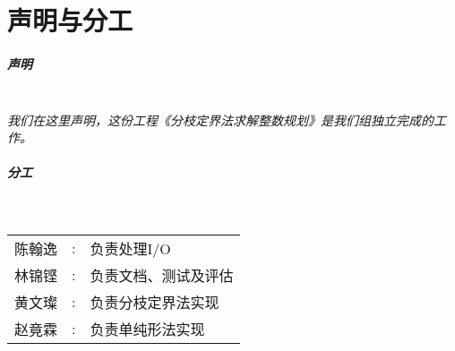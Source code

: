 \chapter{声明与分工}
	\paragraph{声明} ~\\
	
	\textit{我们在这里声明，这份工程《分枝定界法求解整数规划》是我们组独立完成的工作。}
	\vspace{20pt}
	\paragraph{分工} ~\\
	
	\begin{tabular}{l l l}
		陈翰逸 &:& 负责处理I/O\\
		林锦铿 &:& 负责文档、测试及评估\\
		黄文璨 &:& 负责分枝定界法实现\\
		赵竟霖 &:& 负责单纯形法实现\\
	\end{tabular}
